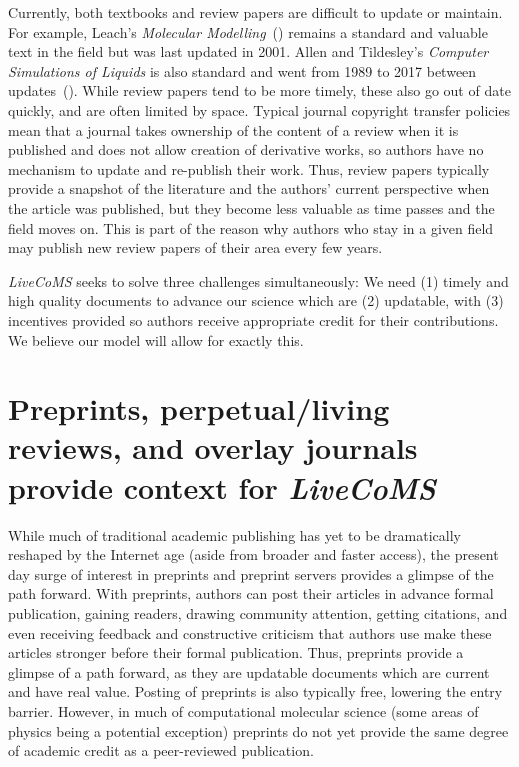 \documentclass[9pt]{livecoms}
\begin{document}
Currently, both textbooks and review papers are difficult to update or maintain.
For example, Leach's \emph{Molecular Modelling}~(\cite{Leach:2001:}) remains a standard and valuable text in the field but was last updated in 2001.
Allen and Tildesley's \emph{Computer Simulations of Liquids} is also standard and went from 1989 to 2017 between updates~(\cite{allen_computer_2017}). 
While review papers tend to be more timely, these also go out of date quickly, and are often limited by space. 
Typical journal copyright transfer policies mean that a journal takes ownership of the content of a review when it is published and does not allow creation of derivative works, so authors have no mechanism to update and re-publish their work.
Thus, review papers typically provide a snapshot of the literature and the authors' current perspective when the article was published, but they become less valuable as time passes and the field moves on.
This is part of the reason why authors who stay in a given field may publish new review papers of their area every few years. 

\emph{LiveCoMS} seeks to solve three challenges simultaneously: We need (1) timely and high quality documents to advance our science which are (2) updatable, with (3) incentives provided so authors receive appropriate credit for their contributions.
We believe our model will allow for exactly this. 

\section{Preprints, perpetual/living reviews, and overlay journals provide context for \emph{LiveCoMS}}

While much of traditional academic publishing has yet to be dramatically reshaped by the Internet age (aside from broader and faster access), the present day surge of interest in preprints and preprint servers provides a glimpse of the path forward.
With preprints, authors can post their articles in advance formal publication, gaining readers, drawing community attention, getting citations, and even receiving feedback and constructive criticism that authors use make these articles stronger before their formal publication.
Thus, preprints provide a glimpse of a path forward, as they are updatable documents which are current and have real value.
Posting of preprints is also typically free, lowering the entry barrier. 
However, in much of computational molecular science (some areas of physics being a potential exception) preprints do not yet provide the same degree of academic credit as a peer-reviewed publication. 
\end{document}

